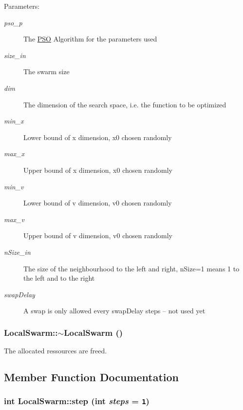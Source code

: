 \begin{Desc}
\item[Parameters: ]\par
\begin{description}
\item[{\em 
pso\_\-p}]The \hyperlink{classPSO}{PSO} Algorithm for the parameters used \item[{\em 
size\_\-in}]The swarm size \item[{\em 
dim}]The dimension of the search space, i.e. the function to be optimized \item[{\em 
min\_\-x}]Lower bound of x dimension, x0 chosen randomly \item[{\em 
max\_\-x}]Upper bound of x dimension, x0 chosen randomly \item[{\em 
min\_\-v}]Lower bound of v dimension, v0 chosen randomly \item[{\em 
max\_\-v}]Upper bound of v dimension, v0 chosen randomly \item[{\em 
nSize\_\-in}]The size of the neighbourhood to the left and right, nSize=1 means 1 to the left and to the right \item[{\em 
swapDelay}]A swap is only allowed every swapDelay steps -- not used yet \end{description}
\end{Desc}
\hypertarget{classLocalSwarm_db0bcad7f87d0e0a3216cf26512869ad}{
\subsubsection{\setlength{\rightskip}{0pt plus 5cm}LocalSwarm::$\sim$LocalSwarm ()}}
\label{classLocalSwarm_db0bcad7f87d0e0a3216cf26512869ad}


The allocated ressources are freed. 



\subsection{Member Function Documentation}
\hypertarget{classLocalSwarm_0321819616ea5252dde257b6d1f739db}{
\subsubsection{\setlength{\rightskip}{0pt plus 5cm}int LocalSwarm::step (int {\em steps} = {\tt 1})}}
\label{classLocalSwarm_0321819616ea5252dde257b6d1f739db}



